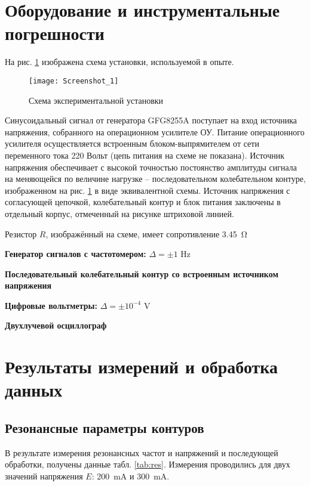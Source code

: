 \documentclass[a4paper]{article}
\newcommand{\Equip}[3]{{\bf #1:} $\Delta = \pm #2$ \si{#3}

}
\newcommand{\equip}[1]{{\bf #1}

}
\begin{document}
\section{Оборудование и инструментальные погрешности}
На рис. \ref{set} изображена схема установки, используемой в опыте.
\begin{figure}[tb]
	\centering
	\texttt{[image: Screenshot\_1]}
	\caption{Схема экспериментальной установки}
	\label{set}
\end{figure}
Синусоидальный сигнал от генератора GFG8255A поступает на вход источника напряжения, собранного на операционном усилителе ОУ. Питание операционного усилителя осуществляется встроенным блоком-выпрямителем от сети переменного тока 220 Вольт (цепь питания на схеме не показана). Источник напряжения обеспечивает с высокой точностью постоянство амплитуды сигнала на меняющейся по величине нагрузке – последовательном колебательном контуре, изображенном на рис. \ref{set} в виде эквивалентной схемы. Источник напряжения с согласующей цепочкой, колебательный контур и блок питания заключены в отдельный корпус, отмеченный на рисунке штриховой линией.

Резистор $ R $, изображённый на схеме, имеет сопротивление \SI{3.45}{\ohm}

\Equip{Генератор сигналов с частотомером}{1}{\hertz}
\equip{Последовательный колебательный контур со встроенным источником напряжения}
\Equip{Цифровые вольтметры}{10^{-4}}{\volt}
\equip{Двухлучевой осциллограф}

\section{Результаты измерений и обработка данных}
\subsection{Резонансные параметры контуров}
\label{respar}
В результате измерения резонансных частот и напряжений и последующей обработки, получены данные табл. \ref{tab:res}.
Измерения проводились для двух значений напряжения $ E $: \SI{200}{\milli \ampere} и \SI{300}{\milli \ampere}. 
\end{document}
